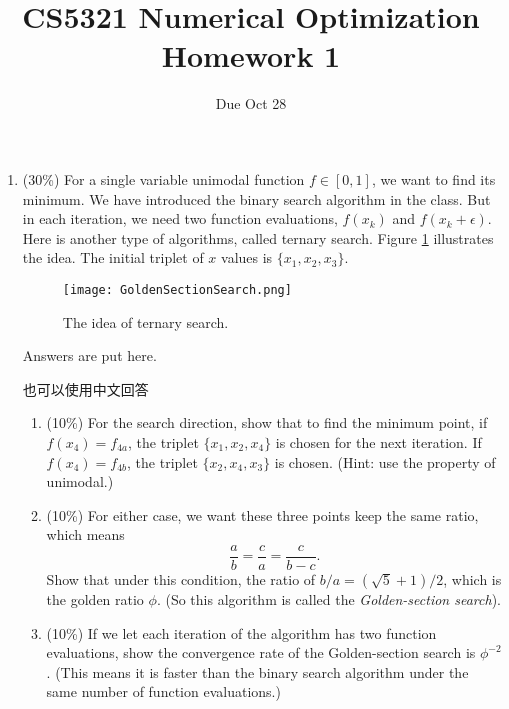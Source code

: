\documentclass[a4paper,10pt]{article}
\title{CS5321 Numerical Optimization Homework 1}
\author{Due Oct 28}
\date{}
\begin{document}
\maketitle
\begin{enumerate}
 \item (30\%) For a single variable unimodal function $f \in [0, 1]$, we want to find its minimum.  We have introduced the binary search algorithm in the class.  But in each iteration, we need two function evaluations, $f(x_k)$ and $f(x_k+\epsilon)$.  Here is another type of algorithms, called ternary search. Figure \ref{fig1} illustrates the idea.  The initial triplet of $x$ values is $\{x_1, x_2, x_3\}$.   
\begin{figure}[h]
\centering
\texttt{[image: GoldenSectionSearch.png]}
\caption{The idea of ternary search.}
\label{fig1}
\end{figure}

{\color{blue} Answers are put here. 

    \begin{CJK*}{UTF8}{bsmi}
也可以使用中文回答
\end{CJK*}

}


\begin{enumerate}
		\item (10\%) For the search direction, show that to find the minimum point, if $f(x_4)=f_{4a}$, the triplet $\{x_1,x_2,x_4\}$ is chosen for the next iteration. If $f(x_4)=f_{4b}$, the triplet $\{x_2, x_4, x_3\}$ is chosen. (Hint: use the property of unimodal.)
    \item (10\%) For either case, we want these three points keep the same ratio, which means
    $$\frac{a}{b} = \frac{c}{a} = \frac{c}{b-c}.$$
    Show that under this condition, the ratio of $b/a=(\sqrt{5}+1)/2$, which is the golden ratio $\phi$. (So this algorithm is called the \emph{Golden-section search}).
    \item (10\%) If we let each iteration of the algorithm has two function evaluations, show the convergence rate of the Golden-section search is  $\phi^{-2}$.  (This means it is faster than the binary search algorithm under the same number of function evaluations.)  
    \end{enumerate}


\end{enumerate}
\end{document}
